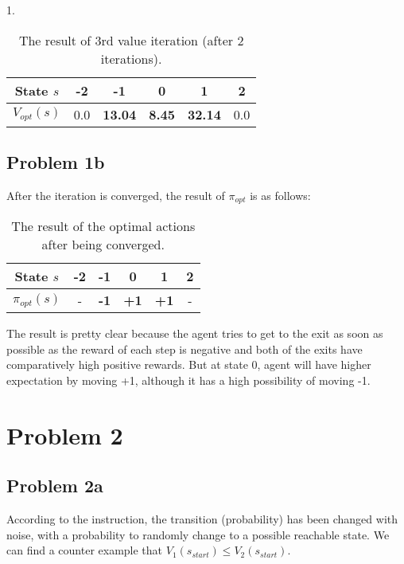 \documentclass[paper=a4, fontsize=10pt]{scrartcl} %
\numberwithin{equation}{section} %
\numberwithin{figure}{section} %
\numberwithin{table}{section} %
\begin{document}
\begin{spacing}{1.}
\begin{table}[h]
\setlength{\abovecaptionskip}{0.cm}
\setlength{\belowcaptionskip}{-0.cm}
\centering
  \caption{The result of 3rd value iteration (after 2 iterations).}
  \begin{tabular}{|c|c|c|c|c|c|}
     \hline
    State $s$ & -2 & -1 & 0 & 1 & 2\\
     \hline
    $V_{opt}(s)$ & 0.0 & \textbf{13.04} & \textbf{8.45} & \textbf{32.14} & 0.0\\
     \hline
  \end{tabular}
\end{table}

\subsection{Problem 1b}
After the iteration is converged, the result of $\pi_{opt}$ is as follows:
\begin{table}[!htbp]
\setlength{\abovecaptionskip}{0.cm}
\setlength{\belowcaptionskip}{-0.cm}
\centering
  \caption{The result of the optimal actions after being converged.}
  \begin{tabular}{|c|c|c|c|c|c|}
     \hline
    State $s$ & -2 & -1 & 0 & 1 & 2\\
     \hline
    $\pi_{opt}(s)$ & - & \textbf{-1} & \textbf{+1} & \textbf{+1} & -\\
     \hline
  \end{tabular}
\end{table}

The result is pretty clear because the agent tries to get to the exit as soon as possible as the reward of each step is negative and both of the exits have comparatively high positive rewards. But at state 0, agent will have higher expectation by moving +1, although it has a high possibility of moving -1.

\section{Problem 2}
\subsection{Problem 2a}
According to the instruction, the transition (probability) has been changed with noise, with a probability to randomly change to a possible reachable state. We can find a counter example that $V_{1}(s_{start}) \le V_{2}(s_{start})$. 


\end{spacing}
\end{document}
